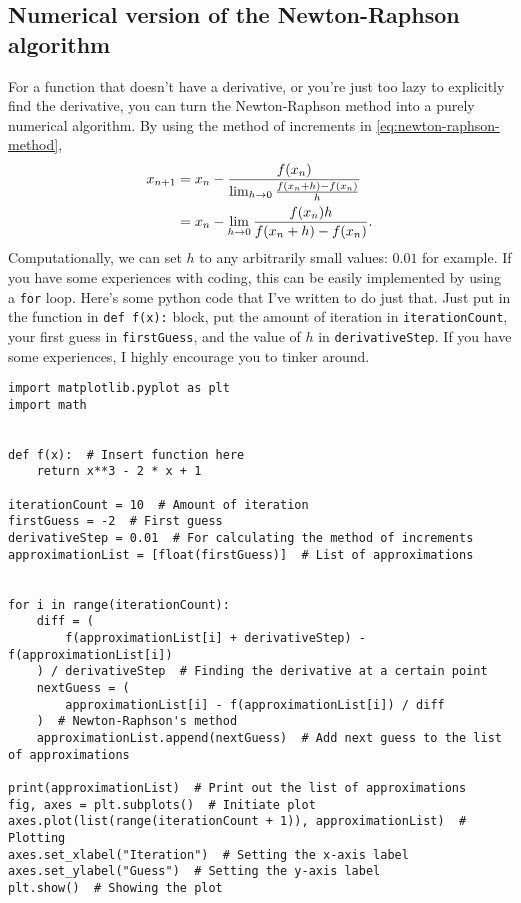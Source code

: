 \subsection{Numerical version of the Newton-Raphson algorithm}

For a function that doesn't have a derivative, or you're just too lazy to explicitly find the derivative, you can turn the Newton-Raphson method into a purely numerical algorithm. By using the method of increments in \cref{eq:newton-raphson-method},
\begin{align}
	x_{n + 1} &= x_n - \frac{f(x_n)}{\lim_{h \rightarrow 0}\frac{f(x_n + h) - f(x_n)}{h}} \\
			  &= x_n - \lim_{h \rightarrow 0}\frac{f(x_n)h}{f(x_n + h) - f(x_n)}.
\end{align}
Computationally, we can set $h$ to any arbitrarily small values: $0.01$ for example. If you have some experiences with coding, this can be easily implemented by using a \texttt{for} loop. Here's some python code that I've written to do just that. Just put in the function in \texttt{def f(x):} block, put the amount of iteration in \texttt{iterationCount}, your first guess in \texttt{firstGuess}, and the value of $h$ in \texttt{derivativeStep}. If you have some experiences, I highly encourage you to tinker around.

\begin{verbatim}
import matplotlib.pyplot as plt
import math


def f(x):  # Insert function here
    return x**3 - 2 * x + 1

iterationCount = 10  # Amount of iteration
firstGuess = -2  # First guess
derivativeStep = 0.01  # For calculating the method of increments
approximationList = [float(firstGuess)]  # List of approximations


for i in range(iterationCount):
    diff = (
        f(approximationList[i] + derivativeStep) - f(approximationList[i])
    ) / derivativeStep  # Finding the derivative at a certain point
    nextGuess = (
        approximationList[i] - f(approximationList[i]) / diff
    )  # Newton-Raphson's method
    approximationList.append(nextGuess)  # Add next guess to the list of approximations

print(approximationList)  # Print out the list of approximations
fig, axes = plt.subplots()  # Initiate plot
axes.plot(list(range(iterationCount + 1)), approximationList)  # Plotting
axes.set_xlabel("Iteration")  # Setting the x-axis label
axes.set_ylabel("Guess")  # Setting the y-axis label
plt.show()  # Showing the plot
\end{verbatim}

